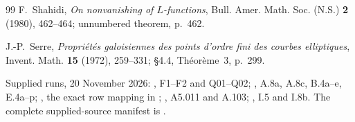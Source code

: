 \documentclass[11pt,a4paper]{article}
\theoremstyle{definition}
\begin{document}
\begin{thebibliography}{99}
F.~Shahidi, \emph{On nonvanishing of $L$-functions},
Bull. Amer. Math. Soc. (N.S.) \textbf{2} (1980), 462--464;
unnumbered theorem, p.~462.

J.-P.~Serre, \emph{Propri\'et\'es galoisiennes des points d'ordre fini des
courbes elliptiques}, Invent. Math. \textbf{15} (1972), 259--331;
\S4.4, Th\'eor\`eme~3, p.~299.

 Supplied runs, 20 November 2026:
, F1--F2 and Q01--Q02;
, A.8a, A.8c, B.4a--e, E.4a--p;
, the exact row mapping in
;
, A5.011 and A.103;
, I.5 and I.8b.
The complete supplied-source manifest is .
\end{thebibliography}
\end{document}
